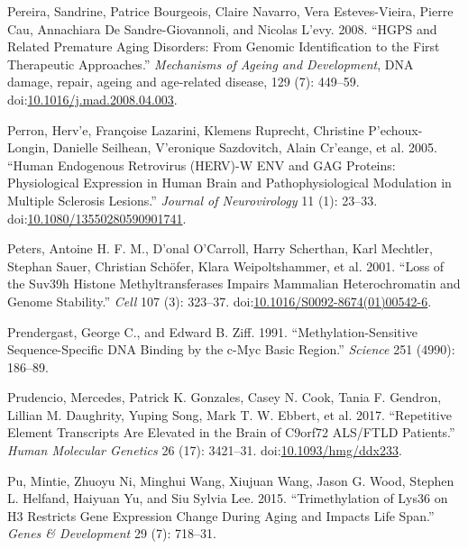 \documentclass[onehalf,12pt]{beavtex}
\begin{document}
  \hypertarget{ref-PereiraHGPSrelatedpremature2008b}{}
  Pereira, Sandrine, Patrice Bourgeois, Claire Navarro, Vera
  Esteves-Vieira, Pierre Cau, Annachiara De Sandre-Giovannoli, and Nicolas
  L\a'evy. 2008. ``HGPS and Related Premature Aging Disorders: From
  Genomic Identification to the First Therapeutic Approaches.''
  \emph{Mechanisms of Ageing and Development}, DNA damage, repair, ageing
  and age-related disease, 129 (7): 449--59.
  doi:\href{https://doi.org/10.1016/j.mad.2008.04.003}{10.1016/j.mad.2008.04.003}.
  
  \hypertarget{ref-PerronHumanendogenousretrovirus2005}{}
  Perron, Herv\a'e, Françoise Lazarini, Klemens Ruprecht, Christine
  P\a'echoux-Longin, Danielle Seilhean, V\a'eronique Sazdovitch, Alain
  Cr\a'eange, et al. 2005. ``Human Endogenous Retrovirus (HERV)-W ENV and
  GAG Proteins: Physiological Expression in Human Brain and
  Pathophysiological Modulation in Multiple Sclerosis Lesions.''
  \emph{Journal of Neurovirology} 11 (1): 23--33.
  doi:\href{https://doi.org/10.1080/13550280590901741}{10.1080/13550280590901741}.
  
  \hypertarget{ref-PetersLossSuv39hHistone2001}{}
  Peters, Antoine H. F. M., D\a'onal O'Carroll, Harry Scherthan, Karl
  Mechtler, Stephan Sauer, Christian Schöfer, Klara Weipoltshammer, et al.
  2001. ``Loss of the Suv39h Histone Methyltransferases Impairs Mammalian
  Heterochromatin and Genome Stability.'' \emph{Cell} 107 (3): 323--37.
  doi:\href{https://doi.org/10.1016/S0092-8674(01)00542-6}{10.1016/S0092-8674(01)00542-6}.
  
  \hypertarget{ref-PrendergastMethylationsensitivesequencespecificDNA1991}{}
  Prendergast, George C., and Edward B. Ziff. 1991.
  ``Methylation-Sensitive Sequence-Specific DNA Binding by the c-Myc Basic
  Region.'' \emph{Science} 251 (4990): 186--89.
  
  \hypertarget{ref-PrudencioRepetitiveelementtranscripts2017}{}
  Prudencio, Mercedes, Patrick K. Gonzales, Casey N. Cook, Tania F.
  Gendron, Lillian M. Daughrity, Yuping Song, Mark T. W. Ebbert, et al.
  2017. ``Repetitive Element Transcripts Are Elevated in the Brain of
  C9orf72 ALS/FTLD Patients.'' \emph{Human Molecular Genetics} 26 (17):
  3421--31.
  doi:\href{https://doi.org/10.1093/hmg/ddx233}{10.1093/hmg/ddx233}.
  
  \hypertarget{ref-PuTrimethylationLys36H32015}{}
  Pu, Mintie, Zhuoyu Ni, Minghui Wang, Xiujuan Wang, Jason G. Wood,
  Stephen L. Helfand, Haiyuan Yu, and Siu Sylvia Lee. 2015.
  ``Trimethylation of Lys36 on H3 Restricts Gene Expression Change During
  Aging and Impacts Life Span.'' \emph{Genes \& Development} 29 (7):
  718--31.
  
\end{document}
